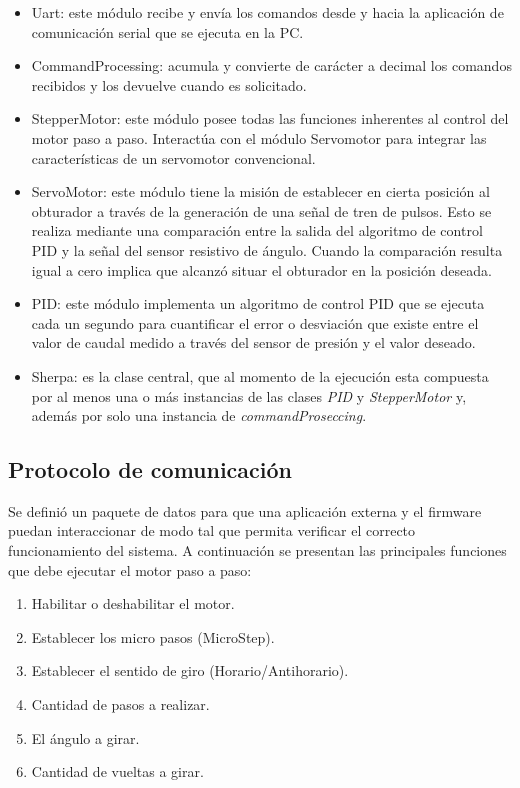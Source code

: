 \begin{itemize}

\item Uart: este módulo recibe y envía los comandos desde y hacia la aplicación de comunicación serial que se ejecuta en la PC.

\item CommandProcessing: acumula y convierte de carácter a decimal los comandos recibidos y los devuelve cuando es solicitado.

\item StepperMotor: este módulo posee todas las funciones inherentes al control del motor paso a paso. Interactúa con el módulo Servomotor para integrar las características de un servomotor convencional. 

\item ServoMotor: este módulo tiene la misión de establecer en cierta posición al obturador a través de la generación de una señal de tren de pulsos. Esto se realiza mediante una comparación entre la salida del algoritmo de control PID y la señal del sensor resistivo de ángulo. Cuando la comparación resulta igual a cero implica que alcanzó situar el obturador en la posición deseada.

\item PID: este módulo implementa un algoritmo de control PID que se ejecuta cada un segundo para cuantificar el error o desviación que existe entre el valor de caudal medido a través del sensor de presión y el valor deseado.
\item Sherpa: es la clase central, que al momento de la ejecución esta compuesta por al menos una o más instancias de las clases \textit{PID} y \textit{StepperMotor} y, además por solo una instancia de \textit{commandProseccing}.
\end{itemize}

\vspace{1cm}
\subsection{Protocolo de comunicación}
\label{subsec:Protocolo de comunicación}
Se definió un paquete de datos para que una aplicación externa y el firmware puedan interaccionar de modo tal que permita verificar el correcto funcionamiento del sistema. 
A continuación se presentan las principales funciones que debe ejecutar el motor paso a paso:

\begin{enumerate}
\item Habilitar o deshabilitar el motor.
\item Establecer los micro pasos (MicroStep).
\item Establecer el sentido de giro (Horario/Antihorario).
\item Cantidad de pasos a realizar.
\item El ángulo a girar.
\item Cantidad de vueltas a girar.
\end{enumerate}

